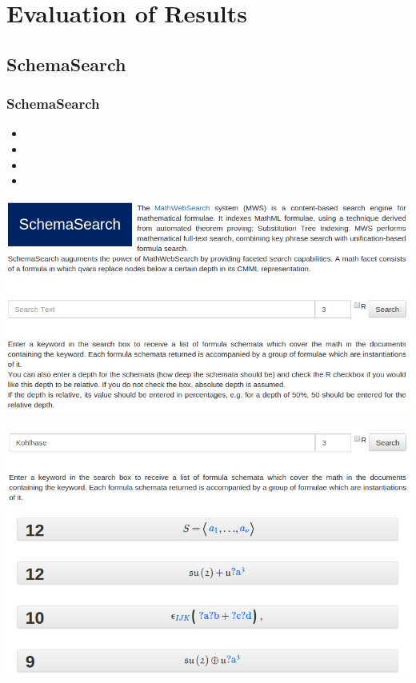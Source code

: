 \documentclass{beamer}
\begin{document}
\section{Evaluation of Results}
\subsection{SchemaSearch}
\begin{frame}
\frametitle{SchemaSearch}
\begin{itemize}
    \item{}
    \item{}
    \item{}
    \item{}
\end{itemize}
\end{frame}
\begin{frame}
    \includegraphics[width=\textwidth]{img/frontend_schema}
\end{frame}
\begin{frame}
    \includegraphics[width=\textwidth]{img/schemataGroup}
\end{frame}
\end{document}
